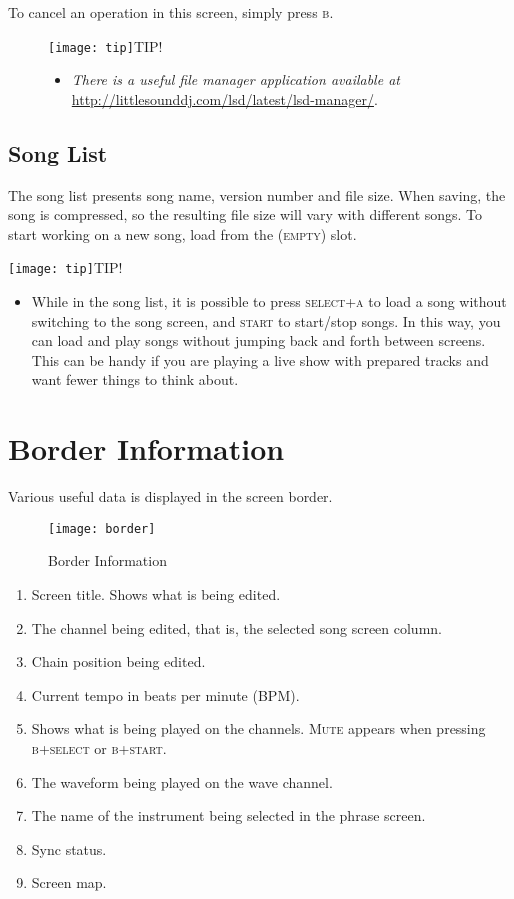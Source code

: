 To cancel an operation in this screen, simply press \textsc{b}.

\begin{figure}[hbtp]
\texttt{[image: tip]}TIP!
\begin{itemize}
        \item \textit{There is a useful file manager application available at} \url{http://littlesounddj.com/lsd/latest/lsd-manager/}.
	\end{itemize}
\end{figure}

\subsection{Song List}

The song list presents song name, version number and file size. When saving, the song is compressed, so the resulting file size will vary with different songs. To start working on a new song, load from the \textsc{(empty)} slot.

\texttt{[image: tip]}TIP!
\begin{itemize}
    \item{While in the song list, it is possible to press \textsc{select+a} to load a song without switching to the song screen, and \textsc{start} to start/stop songs. In this way, you can load and play songs without jumping back and forth between screens. This can be handy if you are playing a live show with prepared tracks and want fewer things to think about.}
\end{itemize}

\section{Border Information}

Various useful data is displayed in the screen border.

\begin{figure}[htpb]
	\begin{center}
	\texttt{[image: border]}
	\end{center}
	\caption{Border Information}
	\label{fig:border}
\end{figure}

\begin{enumerate}
\item Screen title. Shows what is being edited.
\item The channel being edited, that is, the selected song screen column.
\item Chain position being edited.
\item Current tempo in beats per minute (BPM).
\item Shows what is being played on the channels. \textsc{Mute} appears when pressing \textsc{b+select} or \textsc{b+start}.
\item The waveform being played on the wave channel.
\item The name of the instrument being selected in the phrase screen.
\item Sync status.
\item Screen map.
\end{enumerate}


